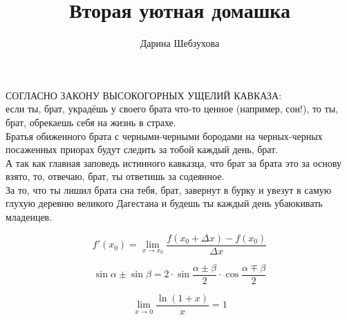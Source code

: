 \documentclass[12pt, a4paper]{article}
\title{Вторая уютная домашка}
\author{Дарина Шебзухова}
\begin{document}
 
\maketitle
\begin{center}
 
\large{СОГЛАСНО ЗАКОНУ ВЫСОКОГОРНЫХ УЩЕЛИЙ КАВКАЗА:\\ если ты, брат, украдёшь у своего брата что-то ценное (например, сон!), то ты, брат, обрекаешь себя на жизнь в страхе. \\Братья обиженного брата с черными-черными бородами на черных-черных посаженных приорах будут следить за тобой каждый день, брат. \\А так как главная заповедь истинного кавказца, что брат за брата это за основу взято, то, отвечаю, брат, ты ответишь за содеянное. \\ За то, что ты лишил брата сна тебя, брат, завернут в бурку и увезут в самую глухую деревню великого Дагестана и будешь ты каждый день убаюкивать младенцев.}

 
\end{center}
\newpage
\begin{equation}
f'(x_0)=\lim\limits_{x \to x_0}\frac{f\left(x_0+\Delta x\right)-f(x_0)}{\Delta x}
\end{equation}
 
\begin{equation}
\sin{\alpha}\pm \sin{\beta} = 2 \cdot \sin{\dfrac{\alpha \pm \beta}{2}} \cdot \cos{\dfrac{\alpha \mp \beta}{2}}
\end{equation}
 
 
\begin{equation}
\lim\limits_{x \to 0}\dfrac{\ln{(1+x)}}{x}=1
\end{equation}
\end{document}
